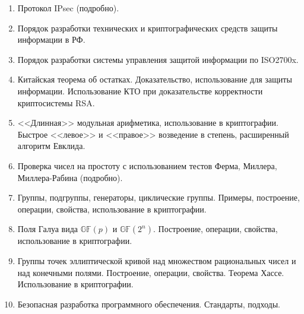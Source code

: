 \begin{enumerate}
    \item Протокол IPsec (подробно).
    \item Порядок разработки технических и криптографических средств защиты информации в РФ.
    \item Порядок разработки системы управления защитой информации по ISO2700x.
    \item Китайская теорема об остатках. Доказательство, использование для защиты информации. Использование КТО при доказательстве корректности криптосистемы RSA.
    \item <<Длинная>> модульная арифметика, использование в криптографии. Быстрое <<левое>> и <<правое>> возведение в степень, расширенный алгоритм Евклида.
    \item Проверка чисел на простоту с использованием тестов Ферма, Миллера, Миллера-Рабина (подробно).
    \item Группы, подгруппы, генераторы, циклические группы. Примеры, построение, операции, свойства, использование в криптографии.
    \item Поля Галуа вида $\mathbb{GF}(p)$ и $\mathbb{GF}(2^n)$. Построение, операции, свойства, использование в криптографии.
    \item Группы точек эллиптической кривой над множеством рациональных чисел и над конечными полями. Построение, операции, свойства. Теорема Хассе. Использование в криптографии.
    \item Безопасная разработка программного обеспечения. Стандарты, подходы.
\end{enumerate}
